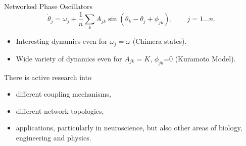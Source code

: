 \documentclass[11pt,reqno]{beamer}
\begin{document}
\begin{frame}{Networked Phase Oscillators}
\[
\dot{\theta}_j = \omega_j + \frac{1}{n}\sum_kA_{jk}\sin(\theta_k - \theta_j + \phi_{jk}) , \qquad j = 1 \ldots n.
\]

\begin{itemize}
	\item Interesting dynamics even for $\omega_j = \omega$ (Chimera states).
	\item Wide variety of dynamics even for $A_{jk}= K$, $\phi_{jk}$=0 (Kuramoto Model).
\end{itemize}
There is active research into
\begin{itemize}
	\item different coupling mechanisms,
    \item different network topologies,
	\item applications, particularly in neuroscience, but also other areas of biology, engineering and physics.
\end{itemize}
\end{frame}
\end{document}

